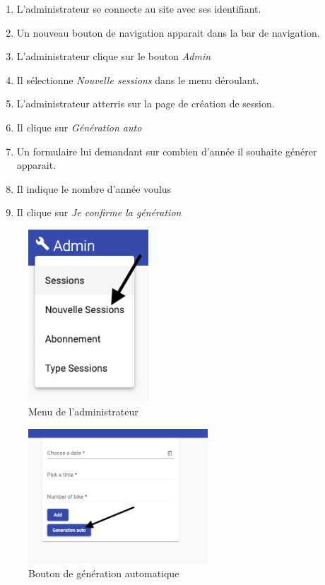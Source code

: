 \begin{enumerate}
	\item L'administrateur se connecte au site avec ses identifiant. 
	\item Un nouveau bouton de navigation apparait dans la bar de navigation. 
	\item L'administrateur clique sur le bouton \textit{Admin}
	\item Il sélectionne \textit{Nouvelle sessions} dans le menu déroulant. 
	\item L'administrateur atterris sur la page de création de session. 
	\item Il clique sur \textit{Génération auto}
	\item Un formulaire lui demandant sur combien d'année il souhaite générer apparait.
	\item Il indique le nombre d'année voulus
	\item Il clique sur \textit{Je confirme la génération} 
\end{enumerate}

\vspace{\baselineskip}
\begin{figure}[h]
	\includegraphics[width=0.4\textwidth,center]{Figures/us16-1}
	\caption{Menu de l'administrateur}
\end{figure}

\newpage
\begin{figure}[h]
	\includegraphics[width=0.6\textwidth,center]{Figures/us16-2}
	\caption{Bouton de génération automatique}
\end{figure}

